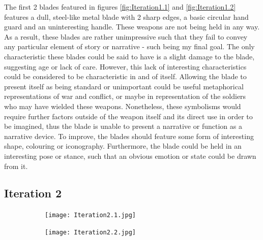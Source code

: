 \documentclass{article}
\begin{document}
The first 2 blades featured in figures \ref{fig:Iteration1.1} and \ref{fig:Iteration1.2} features a dull, steel-like metal blade with 2 sharp edges, a basic circular hand guard and an uninteresting handle. These weapons are not being held in any way. As a result, these blades are rather unimpressive such that they fail to convey any particular element of story or narrative - such being my final goal. The only characteristic these blades could be said to have is a slight damage to the blade, suggesting age or lack of care. However, this lack of interesting characteristics could be considered to be characteristic in and of itself. Allowing the blade to present itself as being standard or unimportant could be useful metaphorical representations of war and conflict, or maybe in representation of the soldiers who may have wielded these weapons. Nonetheless, these symbolisms would require further factors outside of the weapon itself and its direct use in order to be imagined, thus the blade is unable to present a narrative or function as a narrative device. To improve, the blades should feature some form of interesting shape, colouring or iconography. Furthermore, the blade could be held in an interesting pose or stance, such that an obvious emotion or state could be drawn from it.

\pagebreak

\subsection{Iteration 2} \label{Iteration2}

\begin{figure}[h]
    \centering
    \caption{}
    \label{fig:Iteration2}
    \begin{subfigure}{0.49\textwidth}
        \texttt{[image: Iteration2.1.jpg]}
        \caption{}
        \label{fig:Iteration2.1}
    \end{subfigure}
    \begin{subfigure}{0.49\textwidth}
        \texttt{[image: Iteration2.2.jpg]}
        \caption{}
        \label{fig:Iteration2.2}
    \end{subfigure}
\end{figure}
\end{document}
